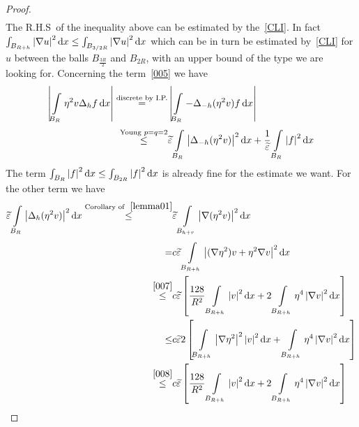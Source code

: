 \begin{proof}
\begin{gather}
	\end{gather}
	The R.H.S\ of the inequality above can be estimated by the~\eqref{CLI}. In fact \( \int_{B_{R+h}}^{} \abs{\nabla u}^{2} \dd{x} \leq \int_{B_{\frac{3}{2}R}}^{} \abs{\nabla u}^{2} \dd{x} \) which can be in turn be estimated by~\eqref{CLI} for \( u \) between the balls \( B_{\frac{3R}{2}} \) and \( B_{2R} \), with an upper bound of the type we are looking for. Concerning the term~\eqref{005} we have
	\begin{align}
		\label{005} \abs{\int\limits_{B_{R}}^{} \eta ^{2} v \Delta _{h} f \dd{x}} \overset{\text{discrete by I.P.}}{=} & \abs{\int\limits_{B_{R}}^{} - \Delta _{-h} (\eta ^{2} v) f  \dd{x}}                                                                                                            \\
		\overset{\text{Young }p=q=2}{\leq}                                                                             & \widetilde{\varepsilon} \int\limits_{B_{R}}^{} \abs{\Delta _{-h}(\eta ^{2}v)}^{2} \dd{x} + \frac{1}{ \widetilde{\varepsilon}} \int\limits_{B_{R}}^{} \abs{f}^{2} \dd{x} \notag
	\end{align}
	The term \( \int_{B_{R}}^{} \left\lvert f\right\rvert^{2} \mathop{}\!\mathrm{d}x \leq \int_{B_{2R}}^{} \left\lvert f\right\rvert^{2} \mathop{}\!\mathrm{d}x \) is already fine for the estimate we want. For the other term we have
	\begin{align}
		\widetilde{\varepsilon }\int\limits_{B_{R}}^{} \abs{\Delta _{h}(\eta ^{2}v)}^{2} \dd{x} \overset{\text{Corollary of }~\ref{lemma01}}{\leq}
		                            & \widetilde{\varepsilon } \int\limits_{B_{h+r}}^{} \abs{\nabla (\eta ^{2}v) }^{2} \dd{x}                                                                                                 \\
		=                           & c \widetilde{\varepsilon }\int\limits_{B_{R+h}}^{} \abs{(\nabla \eta ^{2})v+\eta ^{2} \nabla v }^{2} \dd{x}                                                                             \\
		\overset{\eqref{007}}{\leq} & c \widetilde{\varepsilon} \left[ \frac{128}{R^{2}} \int\limits_{B_{R+h}}^{} \abs{v}^{2} \dd{x} + 2 \int\limits_{B_{R+h}}^{} \eta ^{4} \abs{\nabla v}^{2} \dd{x} \right]                 \\
		\leq                        & c \widetilde{\varepsilon } 2 \left[ \int\limits_{B_{R+h}}^{} \abs{\nabla \eta ^{2}}^{2} \abs{v}^{2} \dd{x} + \int\limits_{B_{R+h}}^{} \eta ^{4} \abs{\nabla v}^{2} \dd{x} \right]       \\
		\overset{\eqref{008}}{\leq} & c \widetilde{\varepsilon} \left[ \frac{128}{R^{2}} \int\limits_{B_{R+h}}^{} \abs{v}^{2} \dd{x} + 2 \int\limits_{B_{R+h}}^{} \eta ^{4} \abs{\nabla v}^{2} \dd{x} \right]                 \\

\end{align}
\end{proof}
